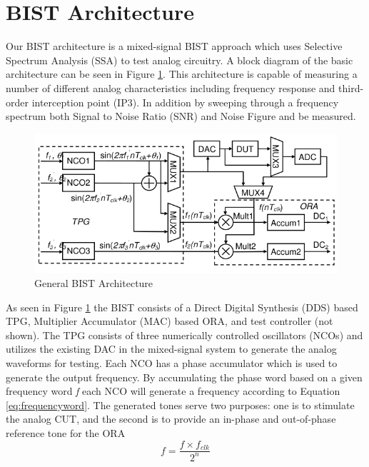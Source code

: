 \documentclass[12pt]{report}
\begin{document}
\section{BIST Architecture}
Our BIST architecture is a mixed-signal BIST approach which uses Selective Spectrum Analysis (SSA) to test analog circuitry.  A block diagram of the basic architecture can be seen in Figure \ref{fig:bist-ssa}.  This architecture is capable of measuring a number of different analog characteristics including frequency response and third-order interception point (IP3)\cite{basessa}.  In addition by sweeping through a frequency spectrum both Signal to Noise Ratio (SNR) and Noise Figure\cite{noisefigure} and be measured.
\begin{figure}
	\begin{center}
		\includegraphics[scale=.5]{images/bist-ssa-architecture}
	\end{center}
	\caption{General BIST Architecture\cite{testtime}}
	\label{fig:bist-ssa}
\end{figure}
As seen in Figure \ref{fig:bist-ssa} the BIST consists of a Direct Digital Synthesis (DDS) based TPG, Multiplier Accumulator (MAC) based ORA, and test controller (not shown).  The TPG consists of three numerically controlled oscillators (NCOs) and utilizes the existing DAC in the mixed-signal system to generate the analog waveforms for testing\cite{testtime}.  Each NCO has a phase accumulator which is used to generate the output frequency\cite{basessa}.  By accumulating the phase word based on a given frequency word \textit{f} each NCO will generate a frequency according to Equation \ref{eq:frequencyword}\cite{testtime}.  The generated tones serve two purposes: one is to stimulate the analog CUT, and the second is to provide an in-phase and out-of-phase reference tone for the ORA\cite{testtime}
\begin{equation}
	f = \frac{f \times f_{clk}}{2^{n}}
	\label{eq:frequencyword}
\end{equation}
\end{document}

